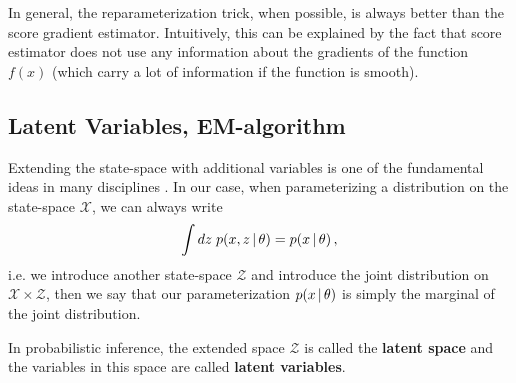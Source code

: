 In general, the reparameterization trick, when possible, is always better than the score gradient estimator.
Intuitively, this can be explained by the fact that score estimator does not use any information about the gradients of the function $f(x)$ (which carry a lot of information if the function is smooth).

\subsection{Latent Variables, EM-algorithm}
\label{sec:em-algo}

Extending the state-space with additional variables is one of the fundamental ideas in many disciplines .
In our case, when parameterizing a distribution on the state-space $\mathcal{X}$, we can always write
\begin{align}
    \int dz\; p(x,z\,|\, \theta) = p(x\,|\,\theta)\,,
\end{align}
i.e. we introduce another state-space $\mathcal{Z}$ and introduce the joint distribution on $\mathcal{X}\times\mathcal{Z}$, then we say that our parameterization $p(x\,|\, \theta)$ is simply the marginal of the joint distribution.
\begin{mybox}
\begin{definition}\label{def:latents}
    In probabilistic inference, the extended space $\mathcal{Z}$ is called the \textbf{latent space} and the variables in this space are called \textbf{latent variables}.
\end{definition}
\end{mybox}

